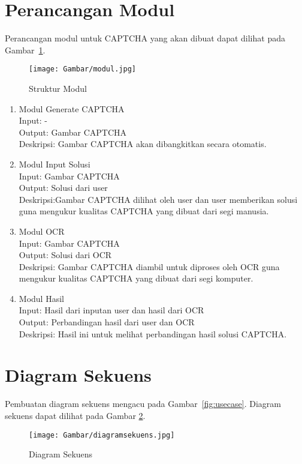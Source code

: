 \section{Perancangan Modul}
\label{sec:perancanganmodul}

Perancangan modul untuk CAPTCHA yang akan dibuat dapat dilihat pada Gambar~\ref{fig:modul}.

\begin{figure}[H]
\centering
\texttt{[image: Gambar/modul.jpg]}
\caption[Struktur Modul]{Struktur Modul} 
\label{fig:modul}
\end{figure}

\begin{enumerate}
\item
Modul Generate CAPTCHA\\
Input: -\\
Output: Gambar CAPTCHA\\
Deskripsi: Gambar CAPTCHA akan dibangkitkan secara otomatis.

\item
Modul Input Solusi\\
Input: Gambar CAPTCHA\\
Output: Solusi dari user\\
Deskripsi:Gambar CAPTCHA dilihat oleh user dan user memberikan solusi guna mengukur kualitas CAPTCHA yang dibuat dari segi manusia.

\item
Modul OCR\\
Input: Gambar CAPTCHA\\
Output: Solusi dari OCR\\
Deskripsi: Gambar CAPTCHA diambil untuk diproses oleh OCR guna mengukur kualitas CAPTCHA yang dibuat dari segi komputer.

\item
Modul Hasil\\
Input: Hasil dari inputan user dan hasil dari OCR\\
Output: Perbandingan hasil dari user dan OCR\\
Deskripsi: Hasil ini untuk melihat perbandingan hasil solusi CAPTCHA.

\end{enumerate}


\section{Diagram Sekuens}
\label{sec:diagramsekuens}

Pembuatan diagram sekuens mengacu pada Gambar~\ref{fig:usecase}. Diagram sekuens dapat dilihat pada Gambar \ref{fig:ds}.

\begin{figure}[H]
\centering
\texttt{[image: Gambar/diagramsekuens.jpg]}
\caption[Diagram Sekuens]{Diagram Sekuens} 
\label{fig:ds}
\end{figure}
